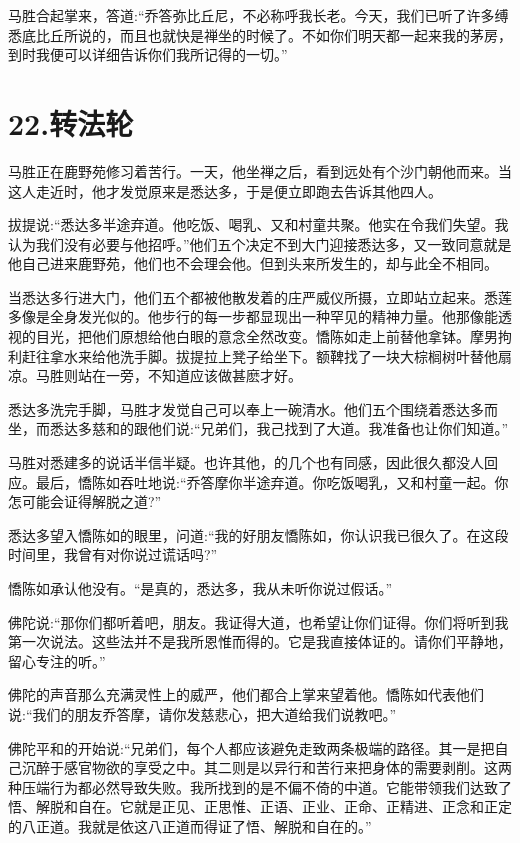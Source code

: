 \documentclass[12pt,twoside,openany]{book}
\begin{document}
马胜合起掌来，答道:“乔答弥比丘尼，不必称呼我长老。今天，我们已听了许多缚悉底比丘所说的，而且也就快是禅坐的时候了。不如你们明天都一起来我的茅房，到时我便可以详细告诉你们我所记得的一切。”


\chapter{22.转法轮}\label{ch22}

马胜正在鹿野苑修习着苦行。一天，他坐禅之后，看到远处有个沙门朝他而来。当这人走近时，他才发觉原来是悉达多，于是便立即跑去告诉其他四人。

拔提说:“悉达多半途弃道。他吃饭、喝乳、又和村童共聚。他实在令我们失望。我认为我们没有必要与他招呼。”他们五个决定不到大门迎接悉达多，又一致同意就是他自己进来鹿野苑，他们也不会理会他。但到头来所发生的，却与此全不相同。

当悉达多行进大门，他们五个都被他散发着的庄严威仪所摄，立即站立起来。悉莲多像是全身发光似的。他步行的每一步都显现出一种罕见的精神力量。他那像能透视的目光，把他们原想给他白眼的意念全然改变。憍陈如走上前替他拿钵。摩男拘利赶往拿水来给他洗手脚。拔提拉上凳子给坐下。额鞞找了一块大棕榈树叶替他扇凉。马胜则站在一旁，不知道应该做甚麽才好。

悉达多洗完手脚，马胜才发觉自己可以奉上一碗清水。他们五个围绕着悉达多而坐，而悉达多慈和的跟他们说:“兄弟们，我己找到了大道。我准备也让你们知道。”

马胜对悉建多的说话半信半疑。也许其他，的几个也有同感，因此很久都没人回应。最后，憍陈如吞吐地说:“乔答摩你半途弃道。你吃饭喝乳，又和村童一起。你怎可能会证得解脱之道?”

悉达多望入憍陈如的眼里，问道:“我的好朋友憍陈如，你认识我已很久了。在这段时间里，我曾有对你说过谎话吗?”

憍陈如承认他没有。“是真的，悉达多，我从未听你说过假话。”

佛陀说:“那你们都听着吧，朋友。我证得大道，也希望让你们证得。你们将听到我第一次说法。这些法并不是我所恩惟而得的。它是我直接体证的。请你们平静地，留心专注的听。”

佛陀的声音那么充满灵性上的威严，他们都合上掌来望着他。憍陈如代表他们说:“我们的朋友乔答摩，请你发慈悲心，把大道给我们说教吧。”

佛陀平和的开始说:“兄弟们，每个人都应该避免走致两条极端的路径。其一是把自己沉醉于感官物欲的享受之中。其二则是以异行和苦行来把身体的需要剥削。这两种压端行为都必然导致失败。我所找到的是不偏不倚的中道。它能带领我们达致了悟、解脱和自在。它就是正见、正思惟、正语、正业、正命、正精进、正念和正定的八正道。我就是依这八正道而得证了悟、解脱和自在的。”
\end{document}
